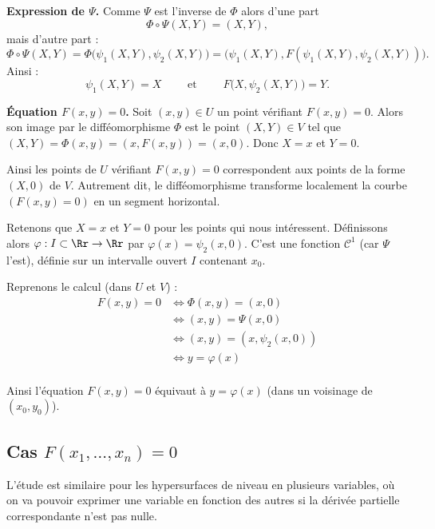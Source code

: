 \documentclass[11pt, class=report,crop=false]{standalone}
\begin{document}
\bigskip

\textbf{Expression de $\Psi$.}
Comme $\Psi$ est l'inverse de $\Phi$ alors d'une part 
$$\Phi \circ \Psi(X,Y) = (X,Y),$$
mais d'autre part :
$$\Phi \circ \Psi(X,Y)
= \Phi\big( \psi_1(X,Y), \psi_2(X,Y) \big) 
= \big(\psi_1(X,Y), F ( \psi_1(X,Y), \psi_2(X,Y)) \big).$$
Ainsi :
$$\psi_1(X,Y) = X \qquad \text{ et } \qquad F \big( X, \psi_2(X,Y) \big) = Y.$$

\bigskip

\textbf{\'Equation $F(x,y)=0$.}
Soit $(x,y) \in U$ un point vérifiant $F(x,y)=0$.
Alors son image par le difféomorphisme $\Phi$ est 
le point $(X,Y) \in V$ tel que $(X,Y)=\Phi(x,y)=(x,F(x,y))=(x,0)$. Donc $X=x$ et $Y=0$.

Ainsi les points de $U$ vérifiant $F(x,y)=0$ correspondent aux points de la forme $(X,0)$ de $V$. Autrement dit, le difféomorphisme transforme localement la courbe $(F(x,y)=0)$ en un segment horizontal.


Retenons que $X=x$ et $Y=0$ pour les points qui nous intéressent. Définissons alors $\varphi : I \subset \Rr \to \Rr$ par $\varphi(x) = \psi_2(x,0)$. C'est une fonction $\mathcal{C}^1$ (car $\Psi$ l'est), définie sur un intervalle ouvert $I$ contenant $x_0$.

Reprenons le calcul (dans $U$ et $V$) :
\begin{align*}
F(x,y) = 0
&\iff \Phi(x,y) = (x,0) \\
&\iff (x,y) = \Psi(x,0) \\
&\iff (x,y) = (x, \psi_2(x,0) ) \\
&\iff y = \varphi(x) \\
\end{align*}   

Ainsi l'équation $F(x,y)=0$ équivaut à $y=\varphi(x)$ (dans un voisinage de $(x_0,y_0)$).


\subsection{Cas $F(x_1,\ldots,x_n) = 0$}

L'étude est similaire pour les hypersurfaces de niveau en plusieurs variables, où on va pouvoir exprimer une variable en fonction des autres si la dérivée partielle correspondante n'est pas nulle. 
\end{document}
